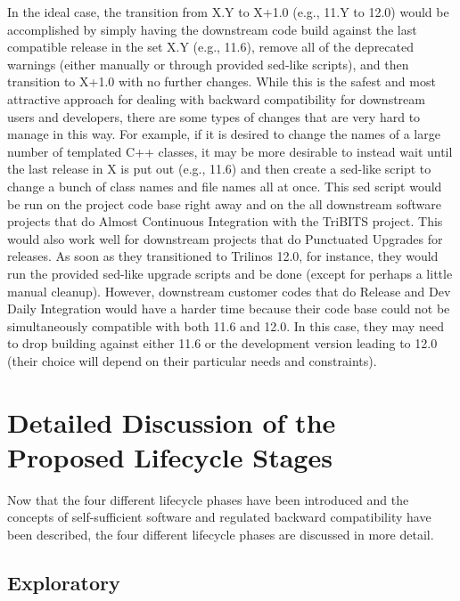 \documentclass[11pt]{SANDreport}
\begin{document}
In the ideal case, the transition from X.Y to X+1.0 (e.g., 11.Y to
12.0) would be accomplished by simply having the downstream code build
against the last compatible release in the set X.Y (e.g., 11.6),
remove all of the deprecated warnings (either manually or through
provided sed-like scripts), and then transition to X+1.0 with no
further changes.  While this is the safest and most attractive
approach for dealing with backward compatibility for downstream users
and developers, there are some types of changes that are very hard to
manage in this way.  For example, if it is desired to change the names
of a large number of templated C++ classes, it may be more desirable
to instead wait until the last release in X is put out (e.g., 11.6)
and then create a sed-like script to change a bunch of class names and
file names all at once.  This sed script would be run on the project
code base right away and on the all downstream software projects that
do Almost Continuous Integration {}\cite{SoftwareIntegrationforCSE09}
with the TriBITS project.  This would also work well for downstream
projects that do Punctuated Upgrades
{}\cite{SoftwareIntegrationforCSE09} for releases.  As soon as they
transitioned to Trilinos 12.0, for instance, they would run the
provided sed-like upgrade scripts and be done (except for perhaps a
little manual cleanup).  However, downstream customer codes that do
Release and Dev Daily Integration {}\cite{SoftwareIntegrationforCSE09}
would have a harder time because their code base could not be
simultaneously compatible with both 11.6 and 12.0.  In this case, they
may need to drop building against either 11.6 or the development
version leading to 12.0 (their choice will depend on their particular
needs and constraints).


%
{}\section{Detailed Discussion of the Proposed Lifecycle Stages}
\label{sec:detained_lifecycle_stages}
%

Now that the four different lifecycle phases have been introduced and
the concepts of self-sufficient software and regulated backward
compatibility have been described, the four different lifecycle phases
are discussed in more detail.


%
{}\subsection{Exploratory}
\label{sec:exploratory_code}
%
\end{document}
